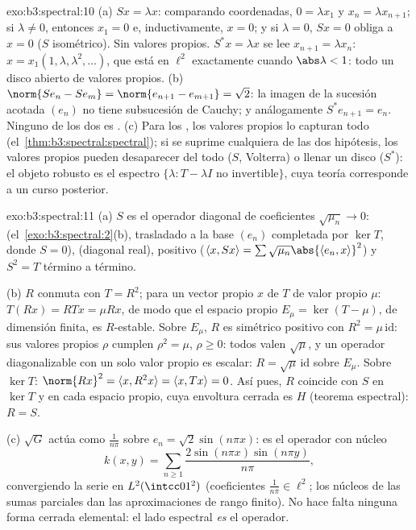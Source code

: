 \begin{solution}{exo:b3:spectral:10}
(a) $Sx = \lambda x$: comparando coordenadas, $0 = \lambda
x_1$ y $x_n = \lambda x_{n+1}$; si $\lambda \ne 0$, entonces $x_1 = 0$
e, inductivamente, $x = 0$; y si $\lambda = 0$, $Sx = 0$ obliga a
$x = 0$ ($S$ isométrico). Sin valores propios. $S^*x =
\lambda x$ se lee $x_{n+1} = \lambda x_n$: $x =
x_1(1, \lambda, \lambda^2, \dots)$, que está en $\ell^2$ exactamente
cuando $\abs\lambda < 1$: todo un disco abierto de valores propios.
(b) $\norm{Se_n - Se_m} = \norm{e_{n+1} - e_{m+1}} = \sqrt2$:
la imagen de la sucesión acotada $(e_n)$ no tiene subsucesión de Cauchy;
y análogamente $S^*e_{n+1} = e_n$. Ninguno de los dos es
. (c) Para los
 , los
valores propios lo capturan todo (el~\cref{thm:b3:spectral:spectral});
si se suprime cualquiera de las dos hipótesis, los valores propios
pueden desaparecer del todo ($S$, Volterra) o llenar un disco ($S^*$):
el objeto robusto es el espectro
$\{\lambda : T - \lambda I \text{ no invertible}\}$, cuya teoría
corresponde a un curso posterior.
\end{solution}

\begin{solution}{exo:b3:spectral:11}
(a) $S$ es el operador diagonal de coeficientes $\sqrt{\mu_n} \to 0$:
(el~\cref{exo:b3:spectral:2}(b), trasladado a la base $(e_n)$ completada
por $\ker T$, donde $S = 0$),
 (diagonal real),
positivo ($\langle x, Sx\rangle =
\sum\sqrt{\mu_n}\abs{\langle e_n, x\rangle}^2$) y $S^2 =
T$ término a término.

(b) $R$ conmuta con $T = R^2$; para un vector propio $x$ de $T$ de valor
propio $\mu$: $T(Rx) = RTx = \mu Rx$, de modo que el espacio propio
$E_\mu = \ker(T - \mu)$, de dimensión finita, es $R$-estable. Sobre
$E_\mu$, $R$ es simétrico positivo con $R^2
= \mu\,\mathrm{id}$: sus valores propios $\rho$ cumplen $\rho^2
= \mu$, $\rho \geq 0$: todos valen $\sqrt\mu$, y un operador
diagonalizable con un solo valor propio es escalar:
$R = \sqrt\mu\,\mathrm{id}$ sobre $E_\mu$. Sobre $\ker T$: $\norm
{Rx}^2 = \langle x, R^2x\rangle = \langle x, Tx\rangle = 0$. Así pues,
$R$ coincide con $S$ en $\ker T$ y en cada espacio propio, cuya
envoltura cerrada es $H$ (teorema espectral): $R = S$.

(c) $\sqrt G$ actúa como $\frac1{n\pi}$ sobre $e_n =
\sqrt2\sin(n\pi x)$: es el operador con núcleo
\[
k(x, y) = \sum_{n\geq1}\frac{2\sin(n\pi x)\sin(n\pi
y)}{n\pi},
\]
convergiendo la serie en $L^2(\intcc01^2)$ (coeficientes
$\frac1{n\pi} \in \ell^2$; los núcleos de las sumas parciales dan las
aproximaciones de rango finito). No hace falta ninguna forma cerrada
elemental: el lado espectral \emph{es} el operador.
\end{solution}

